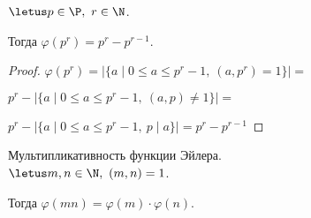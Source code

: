 \begin{theorem-non}
    $\letus p \in \P,~r \in \N$.

    Тогда $\varphi(p^r) = p^r - p^{r-1}$.
\end{theorem-non}

\begin{proof}
    $\varphi(p^r) = |\{a \mid 0 \leq a \leq p^r-1,~(a, p^r) = 1\}| = $

    $p^r -  |\{a \mid 0 \leq a \leq p^r-1,~(a, p) \neq 1\}| = $
    
    $p^r - |\{a \mid 0 \leq a \leq p^r-1,~p \mid a\}| = p^r - p^{r-1}$
\end{proof}

\begin{theorem-non} Мультипликативность функции Эйлера. \\
    $\letus m, n \in \N,~(m, n) = 1$.

    Тогда $\varphi(mn) = \varphi(m) \cdot \varphi(n)$.
\end{theorem-non}

